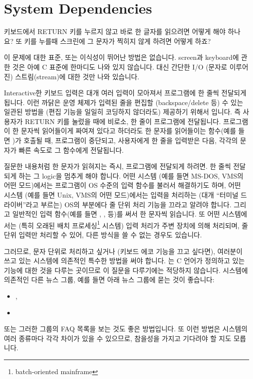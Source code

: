 \chapter{System Dependencies}	\label{chap:sysdep}

\begin{faq}
	키보드에서 RETURN 키를 누르지 않고 바로 한 글자를 읽으려면
	어떻게 해야 하나요? 또 키를 누를때 스크린에 그 문자가 찍히지
	않게 하려면 어떻게 하죠?

\A
	이 문제에 대한 표준, 또는 이식성이 뛰어난 방법은 없습니다.
	screen과 keyboard에 관한 것은 아예 C 표준에 한마디도
	나와 있지 않습니다.  대신 간단한 I/O (문자로 이루어진) 스트림(stream)에
	대한 것만 나와 있습니다.

	Interactive한 키보드 입력은 대개 여러 입력이 모아져서 프로그램에
	한 줄씩 전달되게 됩니다.  이런 까닭은 운영 체제가 입력된 줄을
	편집할 (backspace/delete 등) 수 있는 일관된 방법을 
	(편집 기능을 일일히 코딩하지 않더라도) 제공하기	위해서 입니다.  
	즉 사용자가 RETURN 키를 눌렀을 때에 비로소, 한 줄이 프로그램에
	전달됩니다.  프로그램이 한 문자씩 읽어들이게 짜여져 있다고 하더라도
	한 문자를 읽어들이는 함수(예를 들면 )가 호출될 때,
	프로그램이 중단되고,
	사용자에게 한 줄을 입력받은 다음, 각각의 문자가 빠른 속도로
	그 함수에게 전달됩니다.

	질문한 내용처럼 한 문자가 읽혀지는 즉시, 프로그램에 전달되게 하려면.
	한 줄씩 전달되게 하는 그 logic을 멈추게 해야 합니다.
	어떤 시스템 (예를 들면 MS-DOS, VMS의 어떤 모드)에서는
	프로그램이 OS 수준의 입력 함수를 불러서 해결하기도 하며,
	어떤 시스템 (예를 들면 Unix, VMS의 어떤 모드)에서는
	입력을 처리하는 (대개 ``터미널 드라이버''라고 부르는) OS의
	부분에다 줄 단위 처리 기능을 끄라고 알려야 합니다.
	그리고 일반적인 입력 함수(예를 들면 , , 등)를
	써서 한 문자씩 읽습니다.
	또 어떤 시스템에서는 (특히 오래된 배치
	프로세싱\footnote{batch-oriented mainframe} 시스템) 입력 처리가
	주변 장치에 의해 처리되며, 줄 단위 입력만 처리할 수 있어, 다른
	방식을 쓸 수 없는 경우도 있습니다.

	그러므로, 문자 단위로 처리하고 싶거나 (키보드 에코 기능을 끄고
	싶다면), 여러분이 쓰고 있는 시스템에 의존적인 특수한 방법을
	써야 합니다.  는 C 언어가 정의하고 있는
	기능에 대한 것을 다루는 곳이므로 이 질문을 다루기에는
	적당하지 않습니다.  시스템에 의존적인 다른 뉴스 그룹, 예를
	들면 아래 뉴스 그룹에 묻는 것이 좋습니다:
        \begin{itemize}
          \item {},
          \item {}
        \end{itemize}
	\noindent 또는 그러한 그룹의 FAQ 목록을 보는 것도
	좋은 방법입니다.  또 이런 방법은 시스템의 여러 종류마다 각각 차이가
	있을 수 있으므로, 참을성을 가지고 기다려야 할 지도 모릅니다.


\end{faq}
